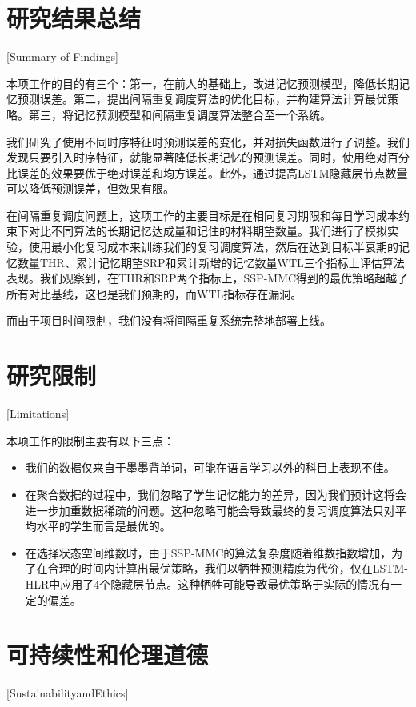 \section{研究结果总结}[Summary of Findings]

本项工作的目的有三个：第一，在前人的基础上，改进记忆预测模型，降低长期记忆预测误差。第二，提出间隔重复调度算法的优化目标，并构建算法计算最优策略。第三，将记忆预测模型和间隔重复调度算法整合至一个系统。

我们研究了使用不同时序特征时预测误差的变化，并对损失函数进行了调整。我们发现只要引入时序特征，就能显著降低长期记忆的预测误差。同时，使用绝对百分比误差的效果要优于绝对误差和均方误差。此外，通过提高LSTM隐藏层节点数量可以降低预测误差，但效果有限。

在间隔重复调度问题上，这项工作的主要目标是在相同复习期限和每日学习成本约束下对比不同算法的长期记忆达成量和记住的材料期望数量。我们进行了模拟实验，使用最小化复习成本来训练我们的复习调度算法，然后在达到目标半衰期的记忆数量THR、累计记忆期望SRP和累计新增的记忆数量WTL三个指标上评估算法表现。我们观察到，在THR和SRP两个指标上，SSP-MMC得到的最优策略超越了所有对比基线，这也是我们预期的，而WTL指标存在漏洞。

而由于项目时间限制，我们没有将间隔重复系统完整地部署上线。

\section{研究限制}[Limitations]

本项工作的限制主要有以下三点：

\begin{itemize}
    \item 我们的数据仅来自于墨墨背单词，可能在语言学习以外的科目上表现不佳。
    \item 在聚合数据的过程中，我们忽略了学生记忆能力的差异，因为我们预计这将会进一步加重数据稀疏的问题。这种忽略可能会导致最终的复习调度算法只对平均水平的学生而言是最优的。
    \item 在选择状态空间维数时，由于SSP-MMC的算法复杂度随着维数指数增加，为了在合理的时间内计算出最优策略，我们以牺牲预测精度为代价，仅在LSTM-HLR中应用了4个隐藏层节点。这种牺牲可能导致最优策略于实际的情况有一定的偏差。
\end{itemize}

\section{可持续性和伦理道德}[SustainabilityandEthics]

